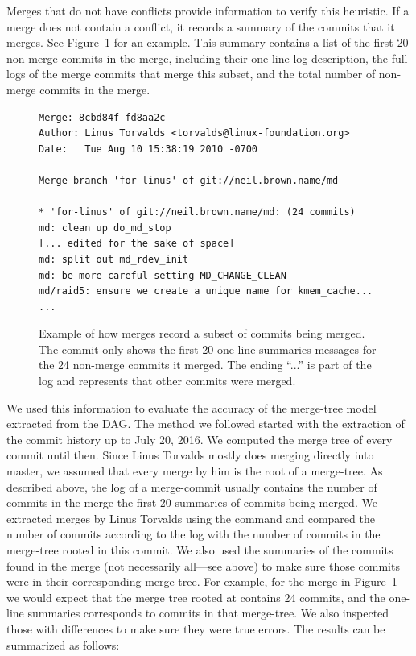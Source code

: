 \documentclass[conference, draftclsnofoot, draft]{IEEEtran}
\begin{document}
Merges that do not have conflicts provide information to verify this heuristic. If a
merge does not contain a conflict, it records a summary of the commits that it
merges. See Figure~\ref{fig:sampleMerge} for an example. This summary contains a
list of the first 20 non-merge commits in the merge, including their one-line log
description, the full logs of the merge commits that merge this subset, and the
total number of non-merge commits in the merge.

\begin{figure}[htbp]
        \centering
        {\fontsize{7}{9}
        \begin{verbatim}
Merge: 8cbd84f fd8aa2c
Author: Linus Torvalds <torvalds@linux-foundation.org>
Date:   Tue Aug 10 15:38:19 2010 -0700

Merge branch 'for-linus' of git://neil.brown.name/md

* 'for-linus' of git://neil.brown.name/md: (24 commits)
md: clean up do_md_stop
[... edited for the sake of space]
md: split out md_rdev_init
md: be more careful setting MD_CHANGE_CLEAN
md/raid5: ensure we create a unique name for kmem_cache...
...
        \end{verbatim}}\vspace{-5mm}
        \caption{Example of how merges record a subset of commits being merged. The
                commit only shows the first 20 one-line summaries messages for the 24
                non-merge commits it merged. The ending ``...'' is part of the log
                and represents that other commits were merged.}
        \label{fig:sampleMerge}
\end{figure}



We used this information to evaluate the accuracy of the merge-tree model extracted from the DAG. The method we followed
started with the extraction of the commit history up to July 20, 2016. We computed the merge tree of every commit until
then. Since Linus Torvalds mostly does merging directly into master, we assumed that every merge by him is the root of a
merge-tree. As described above, the log of a merge-commit usually contains the number of commits in the merge the first 20
summaries of commits being merged. We extracted merges by Linus Torvalds using the command  and compared
the number of commits according to the log with the number of commits in the  merge-tree rooted in this commit. We
also used the summaries of the commits found in the merge (not necessarily all---see above) to make sure those
commits were in their corresponding merge tree. For example, for the merge in
Figure~\ref{fig:sampleMerge} we would expect
that the merge tree rooted at  contains 24 commits, and the one-line summaries corresponds to commits in
that merge-tree. We also inspected those with differences to make sure they were true errors.
The results can be summarized as follows:
\end{document}
